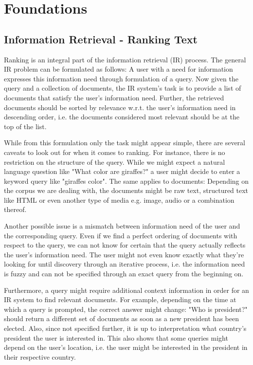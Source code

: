 \chapter{Foundations}
\label{foundations}
\section{Information Retrieval - Ranking Text}
\label{sec:ir}
Ranking is an integral part of the information retrieval (IR) process. The general IR problem can be formulated as follows: A user with a need for information expresses this information need through formulation of a query. Now given the query and a collection of documents, the IR system's task is to provide a list of documents that satisfy the user's information need. Further, the retrieved documents should be sorted by relevance w.r.t. the user's information need in descending order, i.e. the documents considered most relevant should be at the top of the list.

While from this formulation only the task might appear simple, there are several caveats to look out for when it comes to ranking. For instance, there is no restriction on the structure of the query. While we might expect a natural language question like "What color are giraffes?" a user might decide to enter a keyword query like "giraffes color". The same applies to documents: Depending on the corpus we are dealing with, the documents might be raw text, structured text like HTML or even another type of media e.g. image, audio or a combination thereof.

Another possible issue is a mismatch between information need of the user and the corresponding query. Even if we find a perfect ordering of documents with respect to the query, we can not know for certain that the query actually reflects the user's information need. The user might not even know exactly what they're looking for until discovery through an iterative process, i.e. the information need is fuzzy and can not be specified through an exact query from the beginning on.

Furthermore, a query might require additional context information in order for an IR system to find relevant documents. For example, depending on the time at which a query is prompted, the correct answer might change: "Who is president?" should return a different set of documents as soon as a new president has been elected. Also, since not specified further, it is up to interpretation what country's president the user is interested in. This also shows that some queries might depend on the user's location, i.e. the user might be interested in the president in their respective country.

